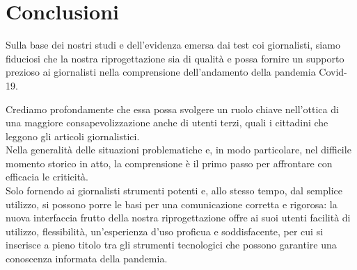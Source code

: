 \documentclass[../../main.tex]{subfiles}
\begin{document}
\section{Conclusioni}
Sulla base dei nostri studi e dell'evidenza emersa dai test coi giornalisti, siamo fiduciosi che la nostra riprogettazione sia di qualità e possa fornire un supporto prezioso ai giornalisti nella comprensione dell'andamento della pandemia Covid-19.

Crediamo profondamente che essa possa svolgere un ruolo chiave nell'ottica di una maggiore consapevolizzazione anche di utenti terzi, quali i cittadini che leggono gli articoli giornalistici.\\
Nella generalità delle situazioni problematiche e, in modo particolare, nel difficile momento storico in atto, la comprensione è il primo passo per affrontare con efficacia le criticità.\\
Solo fornendo ai giornalisti strumenti potenti e, allo stesso tempo, dal semplice utilizzo, si possono porre le basi per una comunicazione corretta e rigorosa: la nuova interfaccia frutto della nostra riprogettazione offre ai suoi utenti facilità di utilizzo, flessibilità, un'esperienza d'uso proficua e soddisfacente, per cui si inserisce a pieno titolo tra gli strumenti tecnologici che possono garantire una conoscenza informata della pandemia.
\end{document}
